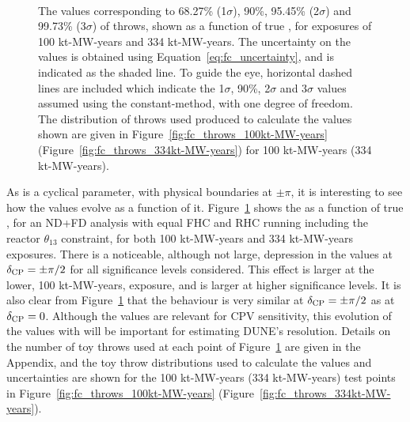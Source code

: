 \begin{figure}[htbp]
  \centering
  \\
  \caption{The \dchisqcrit values corresponding to 68.27\% (1$\sigma$), 90\%, 95.45\% (2$\sigma$) and 99.73\% (3$\sigma$) of throws, shown as a function of true \deltacp, for exposures of 100 kt-MW-years and 334 kt-MW-years. The uncertainty on the \dchisqcrit values is obtained using Equation~\ref{eq:fc_uncertainty}, and is indicated as the shaded line. To guide the eye, horizontal dashed lines are included which indicate the 1$\sigma$, 90\%, 2$\sigma$ and 3$\sigma$ \dchisq values assumed using the constant-\dchisq method, with one degree of freedom. The distribution of throws used produced to calculate the \dchisqcrit values shown are given in Figure~\ref{fig:fc_throws_100kt-MW-years} (Figure~\ref{fig:fc_throws_334kt-MW-years}) for 100 kt-MW-years (334 kt-MW-years).}
  \label{fig:fc_vs_dcp}
\end{figure}
As \deltacp is a cyclical parameter, with physical boundaries at $\pm\pi$, it is interesting to see how the \dchisqcrit values evolve as a function of it. Figure~\ref{fig:fc_vs_dcp} shows the \dchisqcrit as a function of true \deltacp, for an ND+FD analysis with equal FHC and RHC running including the reactor $\theta_{13}$ constraint, for both 100 kt-MW-years and 334 kt-MW-years exposures. There is a noticeable, although not large, depression in the \dchisqcrit values at $\delta_{\rm CP} = \pm\pi/2$ for all significance levels considered. This effect is larger at the lower, 100 kt-MW-years, exposure, and is larger at higher significance levels. It is also clear from Figure~\ref{fig:fc_vs_dcp} that the \dchisqcrit behaviour is very similar at $\delta_{\rm CP} = \pm\pi/2$ as at $\delta_{\rm CP} = 0$. Although the \dchisqcrit values are relevant for CPV sensitivity, this evolution of the \dchisqcrit values with \deltacp will be important for estimating DUNE's \deltacp resolution. Details on the number of toy throws used at each point of Figure~\ref{fig:fc_vs_dcp} are given in the Appendix, and the toy throw distributions used to calculate the \dchisqcrit values and uncertainties are shown for the 100 kt-MW-years (334 kt-MW-years) test points in Figure~\ref{fig:fc_throws_100kt-MW-years} (Figure~\ref{fig:fc_throws_334kt-MW-years}).

